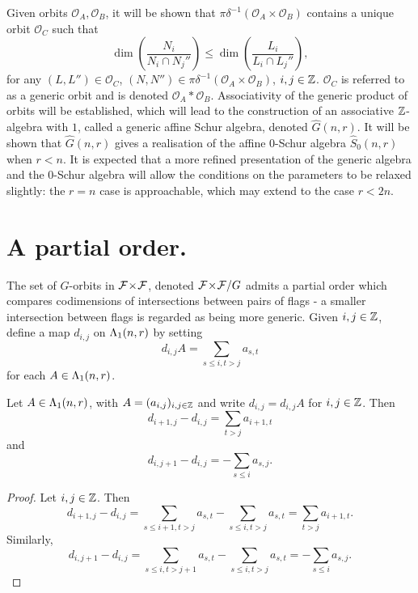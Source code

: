 \documentclass[a4paper, 11pt]{report}
\begin{document}
Given orbits $\mathcal{O}_A,\mathcal{O}_B$, it will be shown that $\pi\delta^{-1}(\mathcal{O}_A\times\mathcal{O}_B)$ contains a unique orbit $\mathcal{O}_C$ such that
\begin{equation*}
\dim\left(\frac{N_i}{N_i\cap N_j''}\right) \le \dim\left(\frac{L_i}{L_i\cap L_j''}\right),
\end{equation*}
for any $(L,L'')\in\mathcal{O}_C$, $(N,N'')\in\pi\delta^{-1}(\mathcal{O}_A\times\mathcal{O}_B)$, $i,j\in\mathbb{Z}$. $\mathcal{O}_C$ is referred to as a generic orbit and is denoted $\mathcal{O}_A\ast \mathcal{O}_B$. Associativity of the generic product of orbits will be established, which will lead to the construction of an associative $\mathbb{Z}$-algebra with $1$, called a generic affine Schur algebra, denoted $\hat{G}(n,r)$. It will be shown that $\hat{G}(n,r)$ gives a realisation of the affine $0$-Schur algebra $\hat{S}_0(n,r)$ when $r<n$. It is expected that a more refined presentation of the generic algebra and the 0-Schur algebra will allow the conditions on the parameters to be relaxed slightly: the $r=n$ case is approachable, which may extend to the case $r<2n$.

\section{A partial order.}

The set of $G$-orbits in ${\mathcal{F}\!\times\!\mathcal{F}}$, denoted ${\mathcal{F}\!\times\!\mathcal{F}}/G$ admits a partial order which compares codimensions of intersections between pairs of flags - a smaller intersection between flags is regarded as being more generic. Given $i,j\in\mathbb{Z}$, define a map $d_{i,j}$ on $\Lambda_1(n,r)$ by setting
\begin{equation*}
d_{i,j}A = \sum_{s\le i,t>j} a_{s,t}
\end{equation*}
for each $A\in\Lambda_1(n,r)$.

\begin{lemma}\label{lemma:differentials}
Let $A\in\Lambda_1(n,r)$, with $A=(a_{i,j})_{i,j\in\mathbb{Z}}$ and write $d_{i,j} = d_{i,j}A$ for $i,j\in\mathbb{Z}$. Then
\begin{equation*}
d_{i+1,j} - d_{i,j} = \sum_{t>j}a_{i+1,t}
\end{equation*}
and
\begin{equation*}
d_{i,j+1}-d_{i,j} = - \sum_{s\le i}a_{s,j}.
\end{equation*}
\end{lemma}

\begin{proof}
Let $i,j\in\mathbb{Z}$. Then
\begin{equation*}
d_{i+1,j} - d_{i,j} = \sum_{s\le i+1,t>j}a_{s,t} - \sum_{s\le i,t>j}a_{s,t} = \sum_{t>j}a_{i+1,t}.
\end{equation*}
Similarly,
\begin{equation*}
d_{i,j+1}-d_{i,j} = \sum_{s\le i,t>j+1}a_{s,t} - \sum_{s\le i,t>j}a_{s,t} = -\sum_{s\le i}a_{s,j}.
\end{equation*}
\end{proof}
\end{document}
